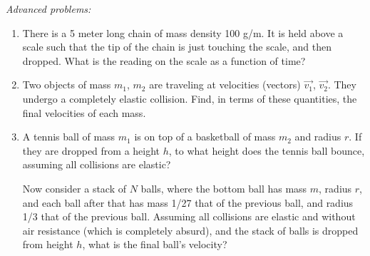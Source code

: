 \documentclass[12pt]{article}
\begin{document}
\emph{Advanced problems:}
\begin{enumerate}
\item
There is a 5 meter long chain of mass density 100 g/m. It is held above a scale such that the tip of the chain is just touching the scale, and then dropped. What is the reading on the scale as a function of time?

\item
Two objects of mass $m_1$, $m_2$ are traveling at velocities (vectors) $\vec{v_1}$, $\vec{v_2}$. They undergo a completely elastic collision. Find, in terms of these quantities, the final velocities of each mass.

\item
A tennis ball of mass $m_1$ is on top of a basketball of mass $m_2$ and radius $r$. If they are dropped from a height $h$, to what height does the tennis ball bounce, assuming all collisions are elastic?

Now consider a stack of $N$ balls, where the bottom ball has mass $m$, radius $r$, and each ball after that has mass 1/27 that of the previous ball, and radius 1/3 that of the previous ball. Assuming all collisions are elastic and without air resistance (which is completely absurd), and the stack of balls is dropped from height $h$, what is the final ball's velocity?

\end{enumerate}
\end{document}

